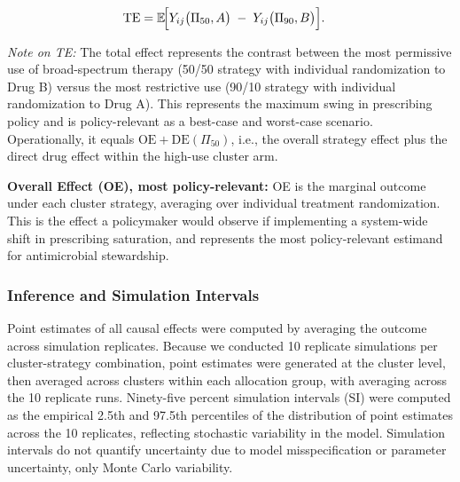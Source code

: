 


\begin{align*}
\mathrm{TE}   &= \mathbb{E}\!\Bigl[
  Y_{ij}\bigl(\Pi_{50},A\bigr)\;-\;
  Y_{ij}\bigl(\Pi_{90},B\bigr)
\Bigr].
\end{align*}

\textit{Note on TE:} The total effect represents the contrast between the most permissive use of
broad-spectrum therapy (50/50 strategy with individual randomization to Drug B) versus the most
restrictive use (90/10 strategy with individual randomization to Drug A). This represents the
maximum swing in prescribing policy and is policy-relevant as a best-case and worst-case scenario.
Operationally, it equals $\mathrm{OE} + \mathrm{DE}(\Pi_{50})$, i.e., the overall strategy effect plus
the direct drug effect within the high-use cluster arm.

\textbf{Overall Effect (OE), most policy-relevant:}
OE is the marginal outcome under each cluster strategy, averaging over individual treatment randomization.
This is the effect a policymaker would observe if implementing a system-wide shift in prescribing saturation,
and represents the most policy-relevant estimand for antimicrobial stewardship.



\subsubsection{Inference and Simulation Intervals}

Point estimates of all causal effects were computed by averaging the outcome across simulation
replicates. Because we conducted 10 replicate simulations per cluster-strategy combination,
point estimates were generated at the cluster level, then averaged across clusters within each
allocation group, with averaging across the 10 replicate runs. Ninety-five percent simulation
intervals (SI) were computed as the empirical 2.5th and 97.5th percentiles of the distribution
of point estimates across the 10 replicates, reflecting stochastic variability in the model.
Simulation intervals do not quantify uncertainty due to model misspecification or parameter
uncertainty, only Monte Carlo variability.

